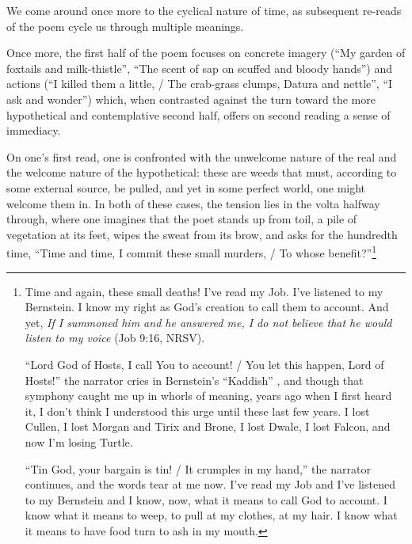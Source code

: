 \documentclass[12pt]{memoir}
\begin{document}
We come around once more to the cyclical nature of time, as subsequent re-reads of the poem cycle us through multiple meanings.

Once more, the first half of the poem focuses on concrete imagery (``My garden of foxtails and milk-thistle'', ``The scent of sap on scuffed and bloody hands'') and actions (``I killed them a little, / The crab-grass clumps, Datura and nettle'', ``I ask and wonder'') which, when contrasted against the turn toward the more hypothetical and contemplative second half, offers on second reading a sense of immediacy.

On one's first read, one is confronted with the unwelcome nature of the real and the welcome nature of the hypothetical: these are weeds that must, according to some external source, be pulled, and yet in some perfect world, one might welcome them in. In both of these cases, the tension lies in the volta halfway through, where one imagines that the poet stands up from toil, a pile of vegetation at its feet, wipes the sweat from its brow, and asks for the hundredth time, ``Time and time, I commit these small murders, / To whose benefit?''\footnote{Time and again, these small deaths! I've read my Job. I've listened to my Bernstein. I know my right as God's creation to call them to account. And yet, \emph{If I summoned him and he answered me, I do not believe that he would listen to my voice} (Job 9:16, NRSV).\par
``Lord God of Hosts, I call You to account! / You let this happen, Lord of Hosts!'' the narrator cries in Bernstein's ``Kaddish'' \parencite{kaddish}, and though that symphony caught me up in whorls of meaning, years ago when I first heard it, I don't think I understood this urge until these last few years. I lost Cullen, I lost Morgan and Tirix and Brone, I lost Dwale, I lost Falcon, and now I'm losing Turtle.\par
``Tin God, your bargain is tin! / It crumples in my hand,'' the narrator continues, and the words tear at me now. I've read my Job and I've listened to my Bernstein and I know, now, what it means to call God to account. I know what it means to weep, to pull at my clothes, at my hair. I know what it means to have food turn to ash in my mouth.}
\end{document}
